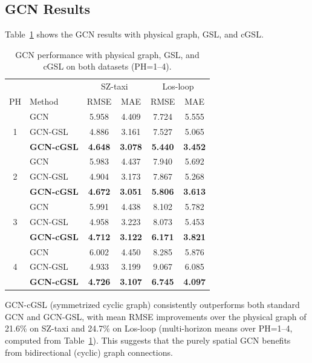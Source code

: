 \subsection{GCN Results}

Table~\ref{tab:gcn_gsl_combined} shows the GCN results with physical graph, GSL, and cGSL.

\begin{table}[!t]
\centering
\caption{GCN performance with physical graph, GSL, and cGSL on both datasets (PH=1--4).}
\label{tab:gcn_gsl_combined}
\small
\begin{tabular}{cl|cc|cc}
\toprule
& & \multicolumn{2}{c}{SZ-taxi} & \multicolumn{2}{c}{Los-loop} \\
PH & Method & RMSE & MAE & RMSE & MAE \\
\midrule
& GCN & 5.958 & 4.409 & 7.724 & 5.555 \\
1 & GCN-GSL & 4.886 & 3.161 & 7.527 & 5.065 \\
& \textbf{GCN-cGSL} & \textbf{4.648} & \textbf{3.078} & \textbf{5.440} & \textbf{3.452} \\
\midrule
& GCN & 5.983 & 4.437 & 7.940 & 5.692 \\
2 & GCN-GSL & 4.904 & 3.173 & 7.867 & 5.268 \\
& \textbf{GCN-cGSL} & \textbf{4.672} & \textbf{3.051} & \textbf{5.806} & \textbf{3.613} \\
\midrule
& GCN & 5.991 & 4.438 & 8.102 & 5.782 \\
3 & GCN-GSL & 4.958 & 3.223 & 8.073 & 5.453 \\
& \textbf{GCN-cGSL} & \textbf{4.712} & \textbf{3.122} & \textbf{6.171} & \textbf{3.821} \\
\midrule
& GCN & 6.002 & 4.450 & 8.285 & 5.876 \\
4 & GCN-GSL & 4.933 & 3.199 & 9.067 & 6.085 \\
& \textbf{GCN-cGSL} & \textbf{4.726} & \textbf{3.107} & \textbf{6.745} & \textbf{4.097} \\
\bottomrule
\end{tabular}
\end{table}

GCN-cGSL (symmetrized cyclic graph) consistently outperforms both standard GCN and GCN-GSL, with mean RMSE improvements over the physical graph of 21.6\% on SZ-taxi and 24.7\% on Los-loop (multi-horizon means over PH=1--4, computed from Table~\ref{tab:gcn_gsl_combined}). This suggests that the purely spatial GCN benefits from bidirectional (cyclic) graph connections.


